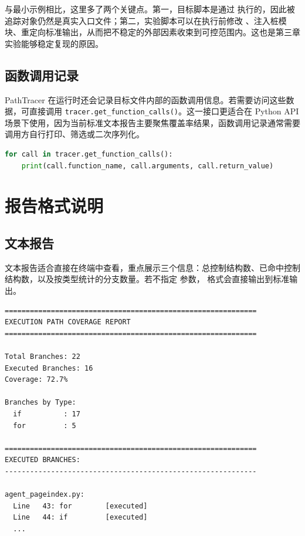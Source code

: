 与最小示例相比，这里多了两个关键点。第一，目标脚本是通过  执行的，因此被追踪对象仍然是真实入口文件；第二，实验脚本可以在执行前修改 、注入桩模块、重定向标准输出，从而把不稳定的外部因素收束到可控范围内。这也是第三章实验能够稳定复现的原因。

\subsection{函数调用记录}

PathTracer 在运行时还会记录目标文件内部的函数调用信息。若需要访问这些数据，可直接调用 \texttt{tracer.get\_function\_calls()}。这一接口更适合在 Python API 场景下使用，因为当前标准文本报告主要聚焦覆盖率结果，函数调用记录通常需要调用方自行打印、筛选或二次序列化。

\begin{lstlisting}[language=Python, caption={读取函数调用记录}]
for call in tracer.get_function_calls():
    print(call.function_name, call.arguments, call.return_value)
\end{lstlisting}

\section{报告格式说明}

\subsection{文本报告}

文本报告适合直接在终端中查看，重点展示三个信息：总控制结构数、已命中控制结构数，以及按类型统计的分支数量。若不指定  参数， 格式会直接输出到标准输出。

\begin{lstlisting}[language={}, caption={文本报告示例}]
============================================================
EXECUTION PATH COVERAGE REPORT
============================================================

Total Branches: 22
Executed Branches: 16
Coverage: 72.7%

Branches by Type:
  if          : 17
  for         : 5

============================================================
EXECUTED BRANCHES:
------------------------------------------------------------

agent_pageindex.py:
  Line   43: for        [executed]
  Line   44: if         [executed]
  ...
\end{lstlisting}

